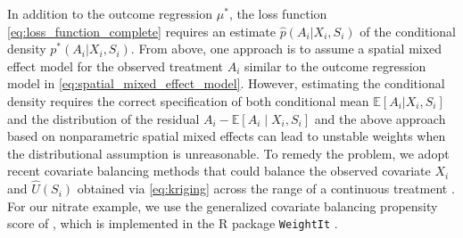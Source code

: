 \documentclass[12pt]{article}
\newtheorem{remark}{Remark}
\newcommand{\E}{\mathbb{E}}
\newcommand{\XL}[1]{{\color{blue}from Xindi: #1}}
\begin{document}
In addition to the outcome regression $\mu^*$, the loss function \eqref{eq:loss_function_complete} requires an estimate $\widehat p(A_i|X_i,S_i)$ of the conditional density $p^*(A_i|X_i,S_i)$. %
From above, one approach is to assume a spatial mixed effect model for the observed treatment $A_i$ similar to the outcome regression model in \eqref{eq:spatial_mixed_effect_model}. However, estimating the conditional density requires the correct specification of both conditional mean $\E[A_i|X_i,S_i]$ and the distribution of the residual $A_i - \E[A_i \mid X_i, S_i]$ and the above approach based on nonparametric spatial mixed effects can lead to unstable weights when the distributional assumption is unreasonable. To remedy the problem, we adopt recent covariate balancing methods 
that could balance the observed covariate $X_i$ and $\widehat U(S_i)$ obtained via \eqref{eq:kriging} across the range of a continuous treatment 
\citep{fong2018covariate, kallus2019kernel, tubbicke2022entropy, huling2024independence}. For our nitrate example, we use the generalized covariate balancing propensity score of \citet{fong2018covariate}, which is implemented in the R package \texttt{WeightIt} \citep{greifer2025weightit}.






\end{document}
